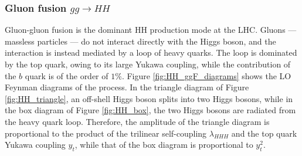 \subsubsection{Gluon fusion $gg\rightarrow HH$}
%
Gluon-gluon fusion is the dominant HH production mode at the LHC. Gluons — massless particles — do not interact directly with the Higgs boson, and the interaction is instead mediated by a loop of heavy quarks. The loop is dominated by the top quark, owing to its large Yukawa coupling, while the contribution of the $b$ quark is of the order of $1\%$. Figure \ref{fig:HH_ggF_diagrams} shows the LO Feynman diagrams of the process. In the triangle diagram of Figure \ref{fig:HH_triangle}, an off-shell Higgs boson splits into two Higgs bosons, while in the box diagram of Figure \ref{fig:HH_box}, the two Higgs bosons are radiated from the heavy quark loop. Therefore, the amplitude of the triangle diagram is proportional to the product of the trilinear self-coupling $\lambda_{HHH}$ and the top quark Yukawa coupling $y_t$, while that of the box diagram is proportional to $y_t^2$.
%
